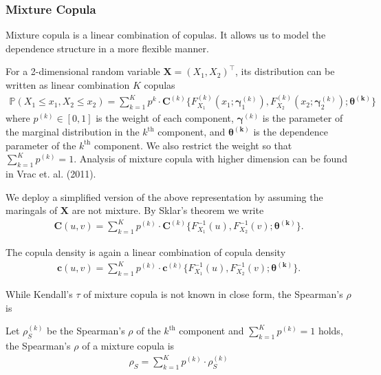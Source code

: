 \subsubsection{Mixture Copula}\label{sec:mixture-copula}
Mixture copula is a linear combination of copulas.
It allows us to model the dependence structure in a more flexible manner.

For a 2-dimensional random variable $\bm{X}=(X_1,X_2)^\intercal$,
its distribution can be written as linear combination $K$ copulas
\begin{align}
    \mathbb{P}(X_1 \leq x_1, X_2 \leq x_2) = \sum_{k=1}^K p^k \cdot \bm{C}^{(k)}\{F^{(k)}_{X_1}(x_1;\bm{\gamma}^{(k)}_1),
    F^{(k)}_{X_2}(x_2;\bm{\gamma}^{(k)}_2); \bm{\theta^{(k)}}\}
    \end{align}
where $p^{(k)} \in [0,1]$ is the weight of each component,
$\bm{\gamma}^{(k)}$ is the parameter of the marginal distribution in the $k^\text{th}$ component,
and $\bm{\theta^{(k)}}$ is the dependence parameter of the $k^\text{th}$ component.
We also restrict the weight so that $\sum_{k=1}^K p^{(k)}=1$.
Analysis of mixture copula with higher dimension can be found in Vrac et. al. (2011).

We deploy a simplified version of the above representation by assuming the maringals of $\bm{X}$ are not mixture.
By Sklar's theorem we write
\begin{align}
    \bm{C}(u,v)= \sum_{k=1}^K p^{(k)} \cdot \bm{C}^{(k)}\{F^{-1}_{X_1}(u),
    F^{-1}_{X_2}(v); \bm{\theta^{(k)}}\}.
    \end{align}\medskip

The copula density is again a linear combination of copula density
\begin{align}
    \bm{c}(u,v)= \sum_{k=1}^K p^{(k)} \cdot \bm{c}^{(k)}\{F^{-1}_{X_1}(u),
    F^{-1}_{X_2}(v); \bm{\theta^{(k)}}\}.
    \end{align}\medskip

While Kendall's $\tau$ of mixture copula is not known in close form,
the Spearman's $\rho$ is

\begin{proposition}
    Let $\rho_S^{(k)}$ be the Spearman's $\rho$ of the $k^\text{th}$ component and $\sum_{k=1}^K p^{(k)}=1$ holds,
    the Spearman's $\rho$ of a mixture copula is
    \begin{align}
        \rho_S = \sum_{k=1}^K p^{(k)} \cdot \rho_S^{(k)}
        \end{align}
    \end{proposition}

